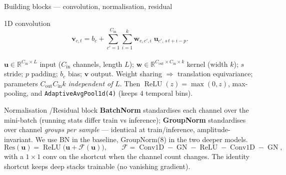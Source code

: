 \documentclass[11pt, aspectratio=169]{beamer}
\newcommand{\R}{\mathbb{R}}
\newcommand{\ReLU}{\operatorname{ReLU}}
\newcommand{\Conv}{\operatorname{Conv1D}}
\newcommand{\GN}{\operatorname{GN}}
\begin{document}
\begin{frame}{Building blocks --- convolution, normalisation, residual}
  \footnotesize
  \begin{block}{1D convolution}
    \vspace{-0.6em}
    \[
      \mathbf{v}_{c,t} = b_c + \sum_{c'=1}^{C_{\mathrm{in}}}\sum_{i=1}^{k}
        \mathbf{w}_{c,c',i}\;\mathbf{u}_{c',\,s\,t+i-p}.
    \]
    \vspace{-0.6em}\\
    $\mathbf{u}\in\R^{C_{\mathrm{in}}\times L}$ input ($C_{\mathrm{in}}$
    channels, length $L$); $\mathbf{w}\in\R^{C_{\mathrm{out}}\times
    C_{\mathrm{in}}\times k}$ kernel (width $k$); $s$ stride; $p$ padding; $b_c$
    bias; $\mathbf{v}$ output. Weight sharing $\Rightarrow$ translation
    equivariance; parameters $C_{\mathrm{out}}C_{\mathrm{in}}k$ \emph{independent
    of} $L$. Then $\ReLU(z)=\max(0,z)$, max-pooling, and
    \texttt{AdaptiveAvgPool1d(4)} (keeps $4$ temporal bins).
  \end{block}
  \begin{block}{Normalisation \quad/\quad Residual block}
    \textbf{BatchNorm} standardises each channel over the mini-batch (running
    stats differ train vs inference); \textbf{GroupNorm} standardises over
    channel \emph{groups per sample} --- identical at train/inference,
    amplitude-invariant. We use BN in the baseline, GroupNorm($8$) in the two
    deeper models.
    \[
      \mathrm{Res}(\mathbf{u}) = \ReLU\!\big(\mathbf{u} + \mathcal{F}(\mathbf{u})\big),
      \qquad \mathcal{F} = \Conv\!-\!\GN\!-\!\ReLU\!-\!\Conv\!-\!\GN,
    \]
    with a $1{\times}1$ conv on the shortcut when the channel count changes. The
    identity shortcut keeps deep stacks trainable (no vanishing gradient).
  \end{block}
\end{frame}
\end{document}
